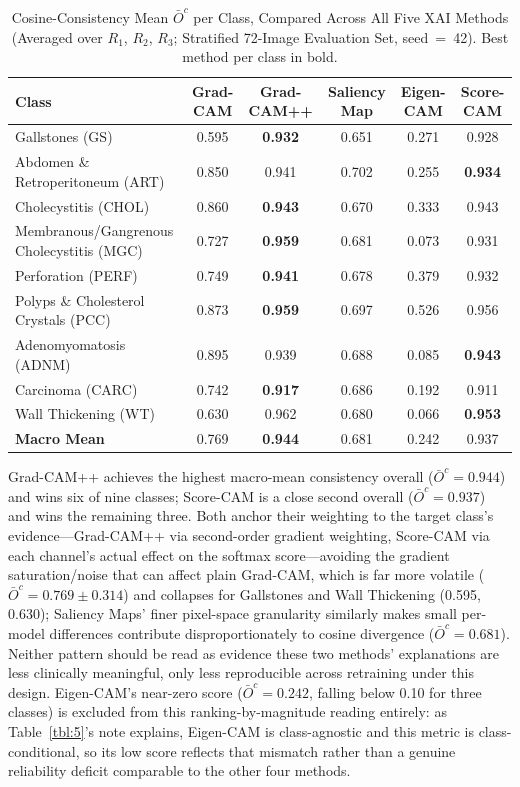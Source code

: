 \begin{table}[!ht]
\centering
\caption{Cosine-Consistency Mean $\bar{O}^c$ per Class, Compared Across All Five XAI Methods (Averaged over $R_1$, $R_2$, $R_3$; Stratified 72-Image Evaluation Set, seed~=~42). Best method per class in bold.}
\label{tbl:6}
\begin{tabular}{lccccc}
\toprule
Class & Grad-CAM & Grad-CAM++ & Saliency Map & Eigen-CAM & Score-CAM \\
\midrule
Gallstones (GS) & 0.595 & \textbf{0.932} & 0.651 & 0.271 & 0.928 \\
Abdomen \& Retroperitoneum (ART) & 0.850 & 0.941 & 0.702 & 0.255 & \textbf{0.934} \\
Cholecystitis (CHOL) & 0.860 & \textbf{0.943} & 0.670 & 0.333 & 0.943 \\
Membranous/Gangrenous Cholecystitis (MGC) & 0.727 & \textbf{0.959} & 0.681 & 0.073 & 0.931 \\
Perforation (PERF) & 0.749 & \textbf{0.941} & 0.678 & 0.379 & 0.932 \\
Polyps \& Cholesterol Crystals (PCC) & 0.873 & \textbf{0.959} & 0.697 & 0.526 & 0.956 \\
Adenomyomatosis (ADNM) & 0.895 & 0.939 & 0.688 & 0.085 & \textbf{0.943} \\
Carcinoma (CARC) & 0.742 & \textbf{0.917} & 0.686 & 0.192 & 0.911 \\
Wall Thickening (WT) & 0.630 & 0.962 & 0.680 & 0.066 & \textbf{0.953} \\
\midrule
\textbf{Macro Mean} & 0.769 & \textbf{0.944} & 0.681 & 0.242 & 0.937 \\
\bottomrule
\end{tabular}

\vspace{2pt}
\raggedright\footnotesize Grad-CAM++ achieves the highest macro-mean consistency overall ($\bar{O}^c=0.944$) and wins six of nine classes; Score-CAM is a close second overall ($\bar{O}^c=0.937$) and wins the remaining three. Both anchor their weighting to the target class's evidence---Grad-CAM++ via second-order gradient weighting, Score-CAM via each channel's actual effect on the softmax score---avoiding the gradient saturation/noise that can affect plain Grad-CAM, which is far more volatile ($\bar{O}^c=0.769\pm0.314$) and collapses for Gallstones and Wall Thickening (0.595, 0.630); Saliency Maps' finer pixel-space granularity similarly makes small per-model differences contribute disproportionately to cosine divergence ($\bar{O}^c=0.681$). Neither pattern should be read as evidence these two methods' explanations are less clinically meaningful, only less reproducible across retraining under this design. Eigen-CAM's near-zero score ($\bar{O}^c=0.242$, falling below 0.10 for three classes) is excluded from this ranking-by-magnitude reading entirely: as Table~\ref{tbl:5}'s note explains, Eigen-CAM is class-agnostic and this metric is class-conditional, so its low score reflects that mismatch rather than a genuine reliability deficit comparable to the other four methods.
\end{table}

